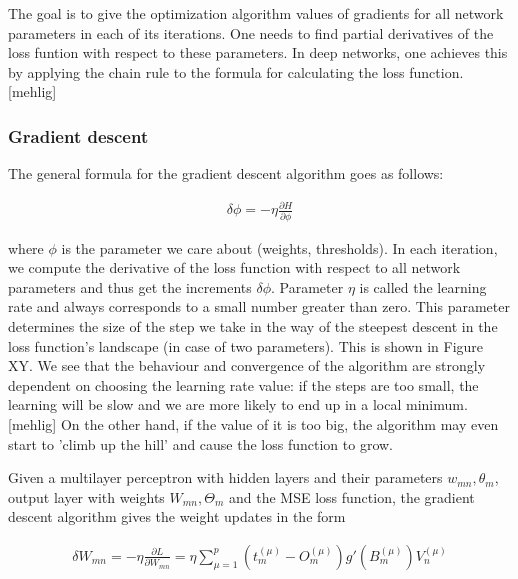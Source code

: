 The goal is to give the optimization algorithm values of gradients for all network parameters in each of its iterations. One needs to find partial derivatives of the loss funtion with respect to these parameters. In deep networks, one achieves this by applying the chain rule to the formula for calculating the loss function. [mehlig]

\subsubsection{Gradient descent}

The general formula for the gradient descent algorithm goes as follows:

\begin{gather}
	\delta \phi = - \eta \frac{\partial H}{\partial \phi}
\end{gather}

where $ \phi $ is the parameter we care about (weights, thresholds). In each iteration, we compute the derivative of the loss function with respect to all network parameters and thus get the increments $ \delta \phi $. Parameter $ \eta $ is called the learning rate and always corresponds to a small number greater than zero. This parameter determines the size of the step we take in the way of the steepest descent in the loss function's landscape (in case of two parameters). This is shown in Figure XY. We see that the behaviour and convergence of the algorithm are strongly dependent on choosing the learning rate value: if the steps are too small, the learning will be slow and we are more likely to end up in a local minimum. [mehlig] On the other hand, if the value of it is too big, the algorithm may even start to 'climb up the hill' and cause the loss function to grow. 

Given a multilayer perceptron with hidden layers and their parameters $ w_{mn}, \theta_m $, output layer with weights $ W_{mn}, \Theta_m $ and the MSE loss function, the gradient descent algorithm gives the weight updates in the form


\begin{gather}
	\delta W_{mn} = - \eta \frac{\partial L}{\partial W_{mn}} = \eta \sum\limits_{\mu=1}^{p}
	(t_{m}^{(\mu)} - O_{m}^{(\mu)})   g'(B_{m}^{(\mu)})     V_{n}^{(\mu)}	
\end{gather}

